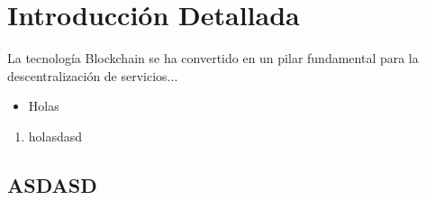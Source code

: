 \section{Introducción Detallada}
La tecnología Blockchain se ha convertido en un pilar fundamental
para la descentralización de servicios...

\lipsum[1-2]

\begin{itemize}
    \item Holas
\end{itemize}

\begin{enumerate}
    \item holasdasd
\end{enumerate}

\subsection{ASDASD}